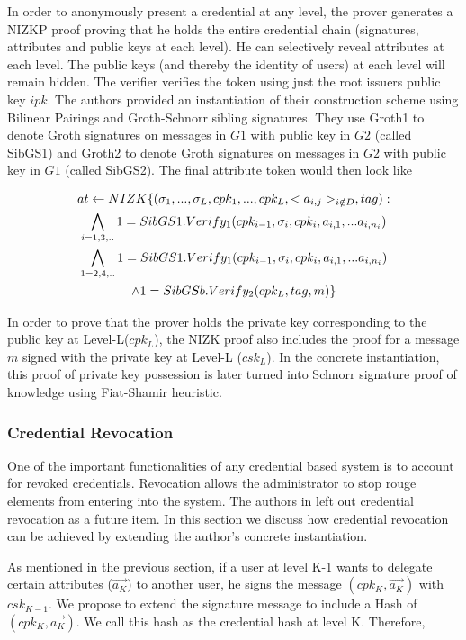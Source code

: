 \documentclass[journal]{IEEEtran}
\begin{document}
In order to anonymously present a credential at any level, the prover generates a NIZKP proof proving that he holds the entire credential chain (signatures, attributes and public keys at each level). He can selectively reveal attributes at each level. The public keys (and thereby the identity of users) at each level will remain hidden. The verifier verifies the token using just the root issuers public key $ipk$. The authors provided an instantiation of their construction scheme using Bilinear Pairings and Groth-Schnorr sibling signatures. They use Groth1 to denote Groth signatures on messages in $G1$ with public key in $G2$ (called SibGS1) and Groth2 to denote Groth signatures on messages in $G2$ with public key in $G1$ (called SibGS2). The final attribute token would then look like

\begin{multline}
$$
at \leftarrow NIZK \lbrace(\sigma_1,...,\sigma_L,cpk_1,...,cpk_L,<a_{i,j}>_{i \notin D},tag) : \\ 
\bigwedge \limits _{i=1,3,..} 1 = SibGS1.Verify_1(cpk_{i-1}, \sigma_i,cpk_i,a_{i,1},...a_{i,n_i})\\
\bigwedge \limits _{1=2,4,..} 1 = SibGS1.Verify_1(cpk_{i-1}, \sigma_i,cpk_i,a_{i,1},...a_{i,n_i})\\
\wedge 1 = SibGSb.Verify_2(cpk_L,tag,m)\rbrace
$$
\end{multline}

In order to prove that the prover holds the private key corresponding to the public key at Level-L($cpk_L$), the NIZK proof also includes the proof for a message $m$ signed with the private key at Level-L ($csk_L$). In the concrete instantiation, this proof of private key possession is later turned into Schnorr signature proof of knowledge using Fiat-Shamir heuristic.

\subsubsection{Credential Revocation} \label{revoke}
One of the important functionalities of any credential based system is to account for revoked credentials. Revocation allows the administrator to stop rouge elements from entering into the system. The authors in \citep{CamenischDD17} left out credential revocation as a future item. In this section we discuss how credential revocation can be achieved by extending the author's concrete instantiation.

As mentioned in the previous section, if a user at level K-1 wants to delegate certain attributes ($\overrightarrow{a_K}$) to another user, he signs the message $(cpk_K,\overrightarrow{a_K})$ with $csk_{K-1}$. We propose to extend the signature message to include a Hash of $(cpk_K , \overrightarrow{a_K})$. We call this hash as the credential hash at level K. Therefore,
\end{document}
